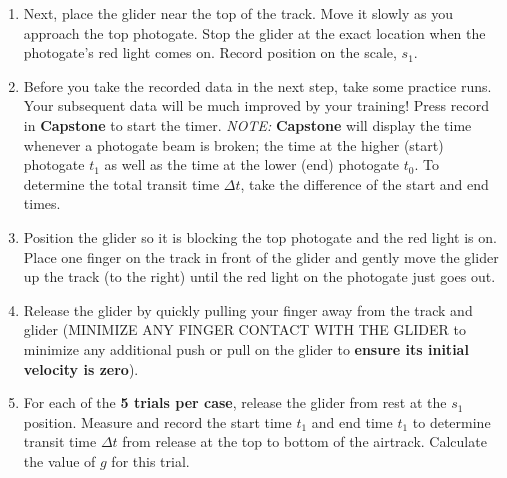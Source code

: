 \begin{enumerate}
\begin{enumerate}
  \item Next, place the glider near the top of the track. Move it slowly as you approach the top photogate. Stop the glider at the exact location when the photogate's red light comes on. Record position on the scale, $s_1$.
  \item Before you take the recorded data in the next step, take some practice runs. Your subsequent data will be much improved by your training! Press record in \textbf{Capstone} to start the timer. \textit{NOTE: }\textbf{Capstone} will display the time whenever a photogate beam is broken; the time at the higher (start) photogate $t_1$ as well as the time at the lower (end) photogate $t_0$. To determine the total transit time $\Delta t$, take the difference of the start and end times.
  \item Position the glider so it is blocking the top photogate and the red light is on. Place one finger on the track in front of the glider and gently move the glider up the track (to the right) until the red light on the photogate just goes out.
  \item Release the glider by quickly pulling your finger away from the track and glider (MINIMIZE ANY FINGER CONTACT WITH THE GLIDER to minimize any additional push or pull on the glider to \textbf{ensure its initial velocity is zero}). 
    \item For each of the \textbf{5 trials per case}, release the glider from rest at the $s_1$ position. Measure and record the start time $t_1$ and end time $t_1$ to determine transit time $\Delta t$ from release at the top to bottom of the airtrack. Calculate the value of $g$ for this trial.

















\end{enumerate}
\end{enumerate}

